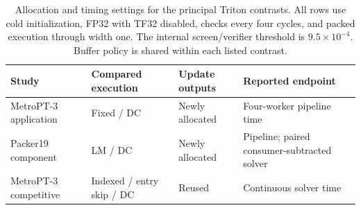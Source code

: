 \begin{table}[!htbp]
\centering
\caption{Allocation and timing settings for the principal Triton contrasts. All rows use cold initialization, FP32 with TF32 disabled, checks every four cycles, and packed execution through width one. The internal screen/verifier threshold is $9.5\times10^{-4}$. Buffer policy is shared within each listed contrast.}
\label{tab:execution-settings}
\small
\setlength{\tabcolsep}{5pt}
\begin{tabular}{@{}llll@{}}
\toprule
Study & Compared execution & Update outputs & Reported endpoint \\
\midrule
MetroPT-3 application & Fixed / DC & Newly allocated & Four-worker pipeline time \\
Packer19 component & LM / DC & Newly allocated & Pipeline; paired consumer-subtracted solver \\
MetroPT-3 competitive & Indexed / entry skip / DC & Reused & Continuous solver time \\
\bottomrule
\end{tabular}
\end{table}
